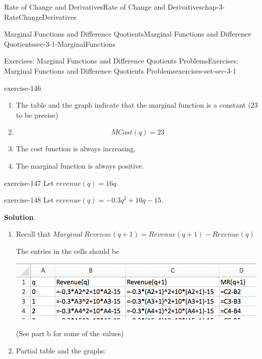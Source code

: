\documentclass[oneside,10pt,]{book}
\numberwithin{equation}{section}
\begin{document}
\begin{chapterptx}{Rate of Change and Derivatives}{}{Rate of Change and Derivatives}{}{}{chap-3-RateChangeDerivatives}
\begin{sectionptx}{Marginal Functions and Difference Quotients}{}{Marginal Functions and Difference Quotients}{}{}{sec-3-1-MarginalFunctions}
\begin{exercises-subsection-numberless}{Exercises: Marginal Functions and Difference Quotients Problems}{}{Exercises: Marginal Functions and Difference Quotients Problems}{}{}{exercises-set-sec-3-1}
\begin{exercisegroup}
\begin{divisionexerciseeg}{7}{}{}{exercise-146}
\begin{enumerate}[label=(\alph*)]
\begin{sidebyside}{1}{0}{0}{0}
\begin{sbspanel}{1}
\end{sbspanel}%
\end{sidebyside}%
\item\hypertarget{li-287}{}\hypertarget{p-968}{}%
The table and the graph indicate that the marginal function is a constant (23 to be precise)%
\item\hypertarget{li-288}{}%
\begin{equation*}
MCost (q)= 23
\end{equation*}
%
\item\hypertarget{li-289}{}\hypertarget{p-969}{}%
The cost function is always increasing.%
\item\hypertarget{li-290}{}\hypertarget{p-970}{}%
The marginal function is always positive.%
\end{enumerate}
\end{divisionexerciseeg}%
\begin{divisionexerciseeg}{8}{}{}{exercise-147}%
\hypertarget{p-971}{}%
Let \(revenue(q)=16 q\).%
\end{divisionexerciseeg}%
\begin{divisionexerciseeg}{9}{}{}{exercise-148}%
\hypertarget{p-972}{}%
Let \(revenue(q)=-0.3q^2+10q-15\).%
\par\smallskip%
\noindent\textbf{Solution}.\hypertarget{solution-72}{}\quad%
\leavevmode%
\begin{enumerate}[label=(\alph*)]
\item\hypertarget{li-291}{}\hypertarget{p-973}{}%
Recall that \(Marginal\ Revenue(q+1)=Revenue(q+1)-Revenue(q)\)%
\par
\hypertarget{p-974}{}%
The entries in the cells should be%
\begin{sidebyside}{1}{0.15}{0.15}{0}%
\begin{sbspanel}{0.7}%
\includegraphics[width=1\linewidth]{images/sec3-1-sol9a.png}
\end{sbspanel}%
\end{sidebyside}%
\par
\hypertarget{p-975}{}%
(See part b for some of the values)%
\item\hypertarget{li-292}{}\hypertarget{p-976}{}%
Partial table and the graphs:%

\end{enumerate}
\end{divisionexerciseeg}
\end{exercisegroup}
\end{exercises-subsection-numberless}
\end{sectionptx}
\end{chapterptx}
\end{document}
